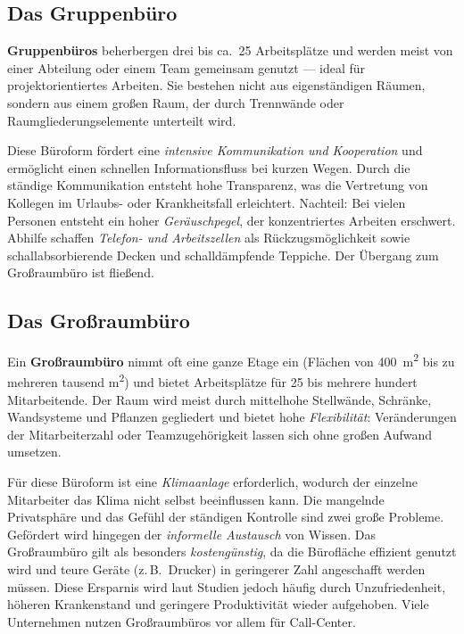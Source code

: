 \documentclass[11pt, a4paper]{article}
\begin{document}
\subsection{Das Gruppenbüro}

\textbf{Gruppenbüros} beherbergen drei bis ca.\ 25 Arbeitsplätze und werden meist von
einer Abteilung oder einem Team gemeinsam genutzt --- ideal für projektorientiertes
Arbeiten. Sie bestehen nicht aus eigenständigen Räumen, sondern aus einem großen Raum,
der durch Trennwände oder Raumgliederungselemente unterteilt wird.

Diese Büroform fördert eine \emph{intensive Kommunikation und Kooperation} und ermöglicht
einen schnellen Informationsfluss bei kurzen Wegen. Durch die ständige Kommunikation
entsteht hohe Transparenz, was die Vertretung von Kollegen im Urlaubs- oder
Krankheitsfall erleichtert. Nachteil: Bei vielen Personen entsteht ein hoher
\emph{Geräuschpegel}, der konzentriertes Arbeiten erschwert. Abhilfe schaffen
\emph{Telefon- und Arbeitszellen} als Rückzugsmöglichkeit sowie schallabsorbierende
Decken und schalldämpfende Teppiche. Der Übergang zum Großraumbüro ist fließend.

\subsection{Das Großraumbüro}

Ein \textbf{Großraumbüro} nimmt oft eine ganze Etage ein (Flächen von 400~m\textsuperscript{2}
bis zu mehreren tausend m\textsuperscript{2}) und bietet Arbeitsplätze für 25 bis mehrere
hundert Mitarbeitende. Der Raum wird meist durch mittelhohe Stellwände, Schränke,
Wandsysteme und Pflanzen gegliedert und bietet hohe \emph{Flexibilität}: Veränderungen
der Mitarbeiterzahl oder Teamzugehörigkeit lassen sich ohne großen Aufwand umsetzen.

Für diese Büroform ist eine \emph{Klimaanlage} erforderlich, wodurch der einzelne
Mitarbeiter das Klima nicht selbst beeinflussen kann. Die mangelnde Privatsphäre und
das Gefühl der ständigen Kontrolle sind zwei große Probleme. Gefördert wird hingegen
der \emph{informelle Austausch} von Wissen. Das Großraumbüro gilt als besonders
\emph{kostengünstig}, da die Bürofläche effizient genutzt wird und teure Geräte (z.\,B.\
Drucker) in geringerer Zahl angeschafft werden müssen. Diese Ersparnis wird laut Studien
jedoch häufig durch Unzufriedenheit, höheren Krankenstand und geringere Produktivität
wieder aufgehoben. Viele Unternehmen nutzen Großraumbüros vor allem für Call-Center.
\end{document}
